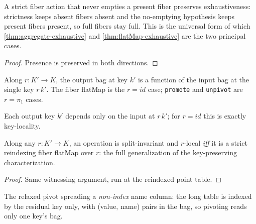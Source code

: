 \begin{theorem}
  \label{thm:fibermap-exhaustive}\leanok
  A strict fiber action that never empties a present fiber preserves
  exhaustiveness: strictness keeps absent fibers absent and the
  no-emptying hypothesis keeps present fibers present, so full fibers
  stay full.  This is the universal form of which
  \ref{thm:aggregate-exhaustive} and \ref{thm:flatMap-exhaustive} are the two
  principal cases.
\end{theorem}
\begin{proof}\leanok
  Presence is preserved in both directions.
\end{proof}

\begin{definition}
  \label{def:reindexmap}\leanok
  Along $r : K' \to K$, the output bag at key $k'$ is a function of the
  input bag at the single key $r\,k'$.  The fiber flatMap is the $r = id$
  case; \texttt{promote} and \texttt{unpivot} are $r = \pi_1$ cases.
\end{definition}

\begin{definition}
  \label{def:reindexlocal}\leanok
  Each output key $k'$ depends only on the input at $r\,k'$; for
  $r = id$ this is exactly key-locality.
\end{definition}

\begin{theorem}
  \label{thm:reindex-iff}
  \leanok
  Along any $r : K' \to K$, an operation is split-invariant and
  $r$-local \emph{iff} it is a strict reindexing fiber flatMap over $r$: the
  full generalization of the key-preserving characterization.
\end{theorem}
\begin{proof}\leanok
  Same witnessing argument, run at the reindexed point table.
\end{proof}

\begin{definition}
  \label{def:pivotattr}\leanok
  The relaxed pivot spreading a \emph{non-index} name column: the long
  table is indexed by the residual key only, with (value, name) pairs in
  the bag, so pivoting reads only one key's bag.
\end{definition}

